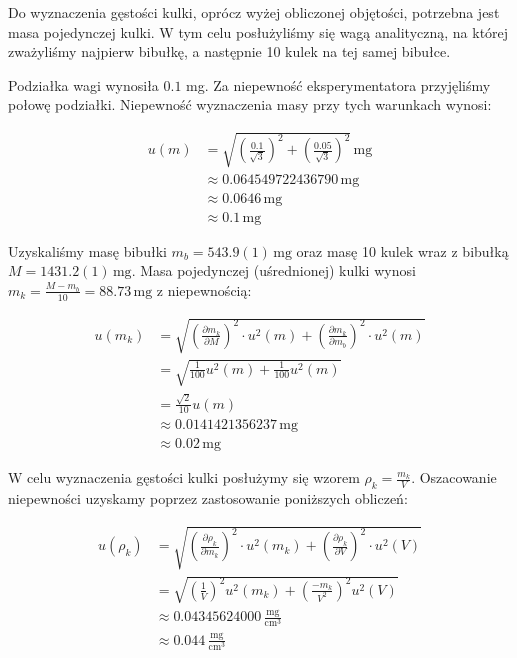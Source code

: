 \documentclass[a4paper]{article}
\begin{document}
Do wyznaczenia gęstości kulki, oprócz wyżej obliczonej objętości, potrzebna jest masa pojedynczej kulki.
W tym celu posłużyliśmy się wagą analityczną, na której zważyliśmy najpierw bibułkę, a następnie 10 kulek na tej samej bibułce.

Podziałka wagi wynosiła $0.1$ mg.
Za niepewność eksperymentatora przyjęliśmy połowę podziałki.
Niepewność wyznaczenia masy przy tych warunkach wynosi:

\begin{align*}
	u(m) &= \sqrt{\left(\frac{0.1}{\sqrt 3}\right)^2 + \left(\frac{0.05}{\sqrt 3}\right)^2} \, \text{mg} \\
	&\approx 0.064549722436790 \, \text{mg} \\
	&\approx 0.0646 \, \text{mg} \\
	&\approx 0.1 \, \text{mg}
\end{align*}

Uzyskaliśmy masę bibułki $m_b = 543.9 (1) \, \text{mg}$ oraz masę 10 kulek wraz z bibułką $M = 1431.2 (1) \, \text{mg}$.
Masa pojedynczej (uśrednionej) kulki wynosi $m_k = \frac{M-m_b}{10} = 88.73 \, \text{mg}$ z niepewnością:

\begin{align*}
	u(m_k) &= \sqrt{\left(\frac{\partial m_k}{\partial M}\right)^2 \cdot u^2(m) + \left(\frac{\partial m_k}{\partial m_b}\right)^2 \cdot u^2(m)} \\
	&= \sqrt{\frac{1}{100} u^2(m) + \frac{1}{100} u^2(m)} \\
	&= \frac{\sqrt 2}{10} u(m) \\
	&\approx 0.0141421356237 \, \text{mg} \\
	&\approx 0.02 \, \text{mg}
\end{align*}

W celu wyznaczenia gęstości kulki posłużymy się wzorem $\rho_k = \frac{m_k}{V}$.
Oszacowanie niepewności uzyskamy poprzez zastosowanie poniższych obliczeń:

\begin{align*}
	u(\rho_k) &= \sqrt{\left(\frac{\partial \rho_k}{\partial m_k}\right)^2 \cdot u^2(m_k) + \left(\frac{\partial \rho_k}{\partial V}\right)^2 \cdot u^2(V)} \\
	&= \sqrt{\left(\frac 1 V\right)^2 u^2(m_k) + \left(\frac{-m_k}{V^2}\right)^2 u^2(V)} \\
	&\approx 0.04345624000 \, \frac{\text{mg}}{\text{cm}^3} \\
	&\approx 0.044 \, \frac{\text{mg}}{\text{cm}^3}
\end{align*}
\end{document}
